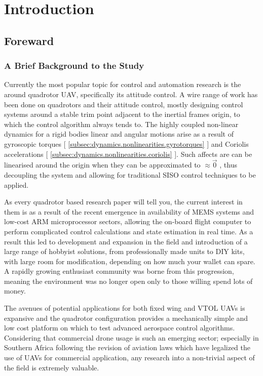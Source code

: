 \chapter{Introduction}
\label{ch:intro}
\section{Foreward}
\label{sec:intro.foreward}
\subsection{A Brief Background to the Study}
\label{subsec:intro.foreward.background}
Currently the most popular topic for control and automation research is the around quadrotor UAV, specifically its attitude control. A wire range of work has been done on quadrotors and their attitude control, mostly designing control systems around a stable trim point adjacent to the inertial frames origin, to which the control algorithm always tends to. The highly coupled non-linear dynamics for a rigid bodies linear and angular motions arise as a result of gyroscopic torques [ \ref{subsec:dynamics.nonlinearities.gyrotorques} ] and Coriolis accelerations [ \ref{subsec:dynamics.nonlinearities.coriolis} ]. Such affects are can be linearised around the origin when they can be approximated to $\approx \vec{0}$ , thus decoupling the system and allowing for traditional SISO control techniques to be applied.
\par
As every quadrotor based research paper will tell you, the current interest in them is as a result of the recent emergence in availability of MEMS systems and low-cost ARM microprocessor sectors, allowing the on-board flight computer to perform complicated control calculations and state estimation in real time. As a result this led to development and expansion in the field and introduction of a large range of hobbyist solutions, from professionally made units to DIY kits, with large room for modification, depending on how much your wallet can spare. A rapidly growing enthusiast community was borne from this progression, meaning the environment was no longer open only to those willing spend lots of money.
\par
The avenues of potential applications for both fixed wing and VTOL UAVs is expansive and the quadrotor configuration provides a mechanically simple and low cost platform on which to test advanced aerospace control algorithms. Considering that commercial drone usage is such an emerging sector; especially in Southern Africa following the revision of aviation laws \cite{safedrone} which have legalized the use of UAVs for commercial application, any research into a non-trivial aspect of the field is extremely valuable. 
